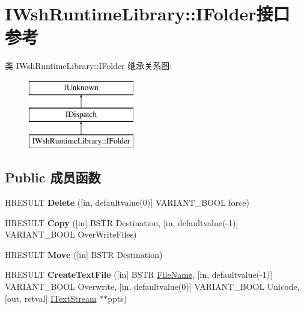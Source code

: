 \hypertarget{interface_i_wsh_runtime_library_1_1_i_folder}{}\section{I\+Wsh\+Runtime\+Library\+:\+:I\+Folder接口 参考}
\label{interface_i_wsh_runtime_library_1_1_i_folder}
类 I\+Wsh\+Runtime\+Library\+:\+:I\+Folder 继承关系图\+:\begin{figure}[H]
\begin{center}
\leavevmode
\includegraphics[height=3.000000cm]{interface_i_wsh_runtime_library_1_1_i_folder}
\end{center}
\end{figure}
\subsection*{Public 成员函数}
\begin{DoxyCompactItemize}
\item 
\mbox{\label{interface_i_wsh_runtime_library_1_1_i_folder_a56e74e6bbb0dc6229d56a26588a781c7}} 
H\+R\+E\+S\+U\+LT {\bfseries Delete} (\mbox{[}in, defaultvalue(0)\mbox{]} V\+A\+R\+I\+A\+N\+T\+\_\+\+B\+O\+OL force)
\item 
\mbox{\label{interface_i_wsh_runtime_library_1_1_i_folder_ad83d0eeffd15bf76659887f3aabde349}} 
H\+R\+E\+S\+U\+LT {\bfseries Copy} (\mbox{[}in\mbox{]} B\+S\+TR Destination, \mbox{[}in, defaultvalue(-\/1)\mbox{]} V\+A\+R\+I\+A\+N\+T\+\_\+\+B\+O\+OL Over\+Write\+Files)
\item 
\mbox{\label{interface_i_wsh_runtime_library_1_1_i_folder_a761ede211e4ae40775e67b504a16f09c}} 
H\+R\+E\+S\+U\+LT {\bfseries Move} (\mbox{[}in\mbox{]} B\+S\+TR Destination)
\item 
\mbox{\label{interface_i_wsh_runtime_library_1_1_i_folder_a7445f376b14779b137a9cee1d07f5cd9}} 
H\+R\+E\+S\+U\+LT {\bfseries Create\+Text\+File} (\mbox{[}in\mbox{]} B\+S\+TR \hyperlink{struct___file_name}{File\+Name}, \mbox{[}in, defaultvalue(-\/1)\mbox{]} V\+A\+R\+I\+A\+N\+T\+\_\+\+B\+O\+OL Overwrite, \mbox{[}in, defaultvalue(0)\mbox{]} V\+A\+R\+I\+A\+N\+T\+\_\+\+B\+O\+OL Unicode, \mbox{[}out, retval\mbox{]} \hyperlink{interface_i_wsh_runtime_library_1_1_i_text_stream}{I\+Text\+Stream} $\ast$$\ast$ppts)
\end{DoxyCompactItemize}
